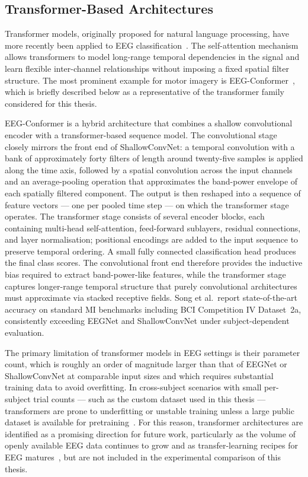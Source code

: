 \documentclass[english, bc, kiv, he, iso690alph, pdf]{fasthesis}
\begin{document}
\subsection{Transformer-Based Architectures}

Transformer models, originally proposed for natural language processing, have more recently been applied to EEG classification~\cite{yadav2025decoding}. The self-attention mechanism allows transformers to model long-range temporal dependencies in the signal and learn flexible inter-channel relationships without imposing a fixed spatial filter structure. The most prominent example for motor imagery is EEG-Conformer~\cite{song2022conformer}, which is briefly described below as a representative of the transformer family considered for this thesis.

EEG-Conformer is a hybrid architecture that combines a shallow convolutional encoder with a transformer-based sequence model. The convolutional stage closely mirrors the front end of ShallowConvNet: a temporal convolution with a bank of approximately forty filters of length around twenty-five samples is applied along the time axis, followed by a spatial convolution across the input channels and an average-pooling operation that approximates the band-power envelope of each spatially filtered component. The output is then reshaped into a sequence of feature vectors --- one per pooled time step --- on which the transformer stage operates. The transformer stage consists of several encoder blocks, each containing multi-head self-attention, feed-forward sublayers, residual connections, and layer normalisation; positional encodings are added to the input sequence to preserve temporal ordering. A small fully connected classification head produces the final class scores. The convolutional front end therefore provides the inductive bias required to extract band-power-like features, while the transformer stage captures longer-range temporal structure that purely convolutional architectures must approximate via stacked receptive fields. Song et al.\ report state-of-the-art accuracy on standard MI benchmarks including BCI Competition IV Dataset~2a, consistently exceeding EEGNet and ShallowConvNet under subject-dependent evaluation.

The primary limitation of transformer models in EEG settings is their parameter count, which is roughly an order of magnitude larger than that of EEGNet or ShallowConvNet at comparable input sizes and which requires substantial training data to avoid overfitting. In cross-subject scenarios with small per-subject trial counts --- such as the custom dataset used in this thesis --- transformers are prone to underfitting or unstable training unless a large public dataset is available for pretraining~\cite{song2022conformer}. For this reason, transformer architectures are identified as a promising direction for future work, particularly as the volume of openly available EEG data continues to grow and as transfer-learning recipes for EEG matures~\cite{wu2022transfer,wan2021review}, but are not included in the experimental comparison of this thesis.
\end{document}
